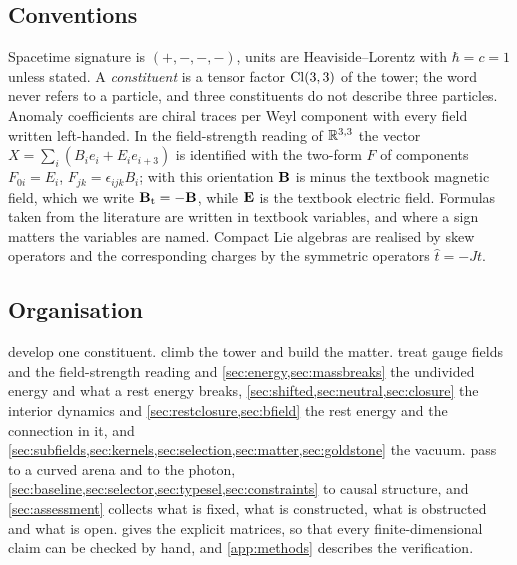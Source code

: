 \subsection{Conventions}
\label{sec:conventions}

Spacetime signature is $(+,-,-,-)$, units are Heaviside--Lorentz with $\hbar=c=1$ unless stated. A \emph{constituent} is
a tensor factor $\mathrm{Cl}(3,3)$ of the tower; the word never refers to a particle, and three constituents do not describe three
particles. Anomaly coefficients are chiral traces per Weyl component with every field written left-handed. In the
field-strength reading of $\mathbb{R}^{3,3}$ the vector $X=\sum_i(B_ie_i+E_ie_{i+3})$ is identified with the two-form $F$ of
components $F_{0i}=E_i$, $F_{jk}=\epsilon_{ijk}B_i$; with this orientation $\mathbf B$ is minus the textbook magnetic field,
which we write $\mathbf B_{\rm t}=-\mathbf B$, while $\mathbf E$ is the textbook electric field. Formulas taken from the literature are written in
textbook variables, and where a sign matters the variables are named. Compact Lie algebras are realised by skew operators
and the corresponding charges by the symmetric operators $\hat t=-Jt$.

\subsection{Organisation}

 develop one constituent.  climb the tower and build the matter.  treat gauge
fields and the field-strength reading and \cref{sec:energy,sec:massbreaks} the undivided energy and what a rest energy breaks,
\cref{sec:shifted,sec:neutral,sec:closure} the interior dynamics and \cref{sec:restclosure,sec:bfield} the rest energy and the connection in it, and
\cref{sec:subfields,sec:kernels,sec:selection,sec:matter,sec:goldstone} the vacuum.  pass to a curved arena and to the photon, \cref{sec:baseline,sec:selector,sec:typesel,sec:constraints} to causal structure, and \cref{sec:assessment} collects what is fixed, what is constructed, what is
obstructed and what is open.  gives the explicit matrices, so that every finite-dimensional claim
can be checked by hand, and \cref{app:methods} describes the verification.
